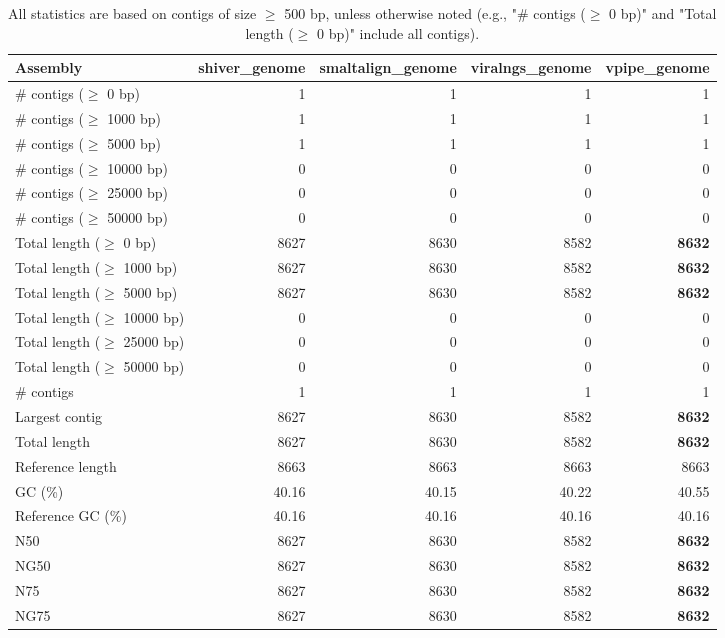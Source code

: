 \documentclass[12pt,a4paper]{article}
\begin{document}
\begin{table}[ht]
\begin{center}
\caption{All statistics are based on contigs of size $\geq$ 500 bp, unless otherwise noted (e.g., "\# contigs ($\geq$ 0 bp)" and "Total length ($\geq$ 0 bp)" include all contigs).}
\begin{tabular}{|l*{4}{|r}|}
\hline
Assembly & shiver\_genome & smaltalign\_genome & viralngs\_genome & vpipe\_genome \\ \hline
\# contigs ($\geq$ 0 bp) & 1 & 1 & 1 & 1 \\ \hline
\# contigs ($\geq$ 1000 bp) & 1 & 1 & 1 & 1 \\ \hline
\# contigs ($\geq$ 5000 bp) & 1 & 1 & 1 & 1 \\ \hline
\# contigs ($\geq$ 10000 bp) & 0 & 0 & 0 & 0 \\ \hline
\# contigs ($\geq$ 25000 bp) & 0 & 0 & 0 & 0 \\ \hline
\# contigs ($\geq$ 50000 bp) & 0 & 0 & 0 & 0 \\ \hline
Total length ($\geq$ 0 bp) & 8627 & 8630 & 8582 & {\bf 8632} \\ \hline
Total length ($\geq$ 1000 bp) & 8627 & 8630 & 8582 & {\bf 8632} \\ \hline
Total length ($\geq$ 5000 bp) & 8627 & 8630 & 8582 & {\bf 8632} \\ \hline
Total length ($\geq$ 10000 bp) & 0 & 0 & 0 & 0 \\ \hline
Total length ($\geq$ 25000 bp) & 0 & 0 & 0 & 0 \\ \hline
Total length ($\geq$ 50000 bp) & 0 & 0 & 0 & 0 \\ \hline
\# contigs & 1 & 1 & 1 & 1 \\ \hline
Largest contig & 8627 & 8630 & 8582 & {\bf 8632} \\ \hline
Total length & 8627 & 8630 & 8582 & {\bf 8632} \\ \hline
Reference length & 8663 & 8663 & 8663 & 8663 \\ \hline
GC (\%) & 40.16 & 40.15 & 40.22 & 40.55 \\ \hline
Reference GC (\%) & 40.16 & 40.16 & 40.16 & 40.16 \\ \hline
N50 & 8627 & 8630 & 8582 & {\bf 8632} \\ \hline
NG50 & 8627 & 8630 & 8582 & {\bf 8632} \\ \hline
N75 & 8627 & 8630 & 8582 & {\bf 8632} \\ \hline
NG75 & 8627 & 8630 & 8582 & {\bf 8632} \\ \hline

\end{tabular}
\end{center}
\end{table}
\end{document}
